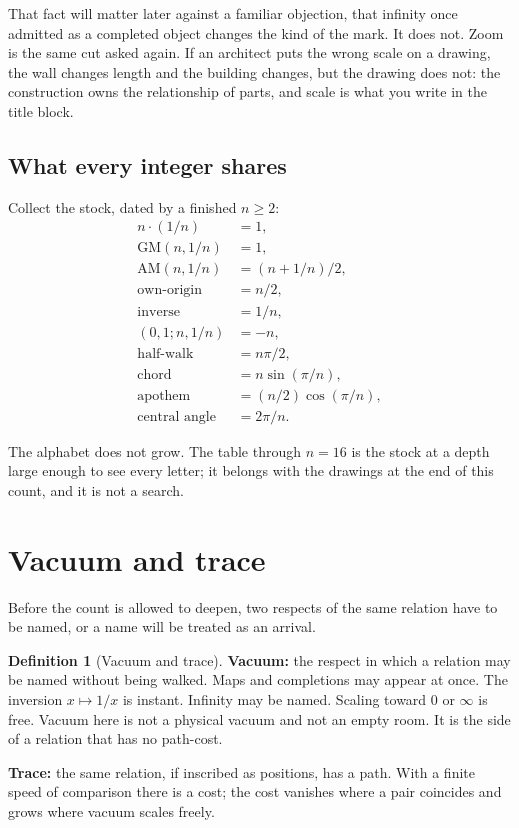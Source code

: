 \documentclass[10pt,a4paper]{article}
\theoremstyle{plain}
\theoremstyle{definition}
\newtheorem{definition}{Definition}
\theoremstyle{remark}
\begin{document}
That fact will matter later against a familiar objection, that infinity once admitted as a completed object changes the kind of the mark.
It does not.
Zoom is the same cut asked again.
If an architect puts the wrong scale on a drawing, the wall changes length and the building changes, but the drawing does not: the construction owns the relationship of parts, and scale is what you write in the title block.

\subsection{What every integer shares}

Collect the stock, dated by a finished \(n\ge 2\):
\begin{align*}
n\cdot(1/n)&=1,\\
\mathrm{GM}(n,1/n)&=1,\\
\mathrm{AM}(n,1/n)&=(n+1/n)/2,\\
\text{own-origin}&=n/2,\\
\text{inverse}&=1/n,\\
(0,1;n,1/n)&=-n,\\
\text{half-walk}&=n\pi/2,\\
\text{chord}&=n\sin(\pi/n),\\
\text{apothem}&=(n/2)\cos(\pi/n),\\
\text{central angle}&=2\pi/n.
\end{align*}

The alphabet does not grow.
The table through \(n=16\) is the stock at a depth large enough to see every letter; it belongs with the drawings at the end of this count, and it is not a search.

\section{Vacuum and trace}

Before the count is allowed to deepen, two respects of the same relation have to be named, or a name will be treated as an arrival.

\begin{definition}[Vacuum and trace]
\textbf{Vacuum:} the respect in which a relation may be named without being walked.
Maps and completions may appear at once.
The inversion \(x\mapsto 1/x\) is instant.
Infinity may be named.
Scaling toward \(0\) or \(\infty\) is free.
Vacuum here is not a physical vacuum and not an empty room.
It is the side of a relation that has no path-cost.

\textbf{Trace:} the same relation, if inscribed as positions, has a path.
With a finite speed of comparison there is a cost; the cost vanishes where a pair coincides and grows where vacuum scales freely.
\end{definition}
\end{document}

